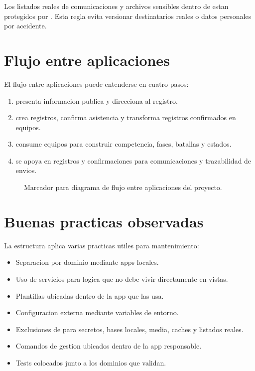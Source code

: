 Los listados reales de comunicaciones y archivos sensibles dentro de  estan protegidos por . Esta regla evita versionar destinatarios reales o datos personales por accidente.

\section{Flujo entre aplicaciones}
\label{sec:estructura-flujo-apps}

El flujo entre aplicaciones puede entenderse en cuatro pasos:

\begin{enumerate}
  \item {} presenta informacion publica y direcciona al registro.
  \item {} crea registros, confirma asistencia y transforma registros confirmados en equipos.
  \item {} consume equipos para construir competencia, fases, batallas y estados.
  \item {} se apoya en registros y confirmaciones para comunicaciones y trazabilidad de envios.
\end{enumerate}

\begin{figure}[H]
  \centering
  \caption{Marcador para diagrama de flujo entre aplicaciones del proyecto.}
  \label{fig:estructura-flujo-aplicaciones}
\end{figure}

\section{Buenas practicas observadas}
\label{sec:estructura-buenas-practicas}

La estructura aplica varias practicas utiles para mantenimiento:

\begin{itemize}
  \item Separacion por dominio mediante apps locales.
  \item Uso de servicios para logica que no debe vivir directamente en vistas.
  \item Plantillas ubicadas dentro de la app que las usa.
  \item Configuracion externa mediante variables de entorno.
  \item Exclusiones de  para secretos, bases locales, media, caches y listados reales.
  \item Comandos de gestion ubicados dentro de la app responsable.
  \item Tests colocados junto a los dominios que validan.
\end{itemize}

